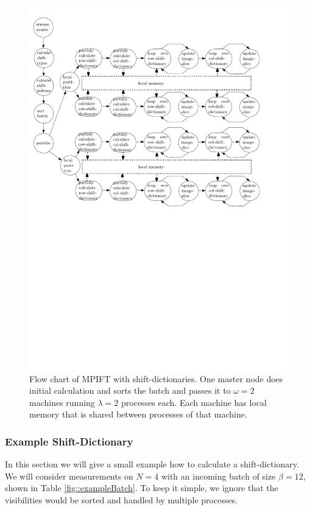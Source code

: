 \documentclass[12pt]{article}
\begin{document}
\begin{figure}[H]
	\begin{center}
	\includegraphics[width=400pt]{SPIFT_WITH_DIC_plan}
\end{center}
	\caption{Flow chart of MPIFT with shift-dictionaries. One master node does initial calculation and sorts the batch and passes it to $\omega=2$ machines running $\lambda=2$ processes each. Each machine has local memory that is shared between processes of that machine.}
	\label{fig::spift_with_dic_plan}
\end{figure}

\subsubsection{Example Shift-Dictionary}
\label{sec::exampleShiftDic}

In this section we will give a small example how to calculate a shift-dictionary. We will consider measurements on $N=4$ with an incoming batch of size $\beta = 12$, shown in Table \ref{fig::exampleBatch}. To keep it simple, we ignore that the visibilities would be sorted and handled by multiple processes.
\end{document}
